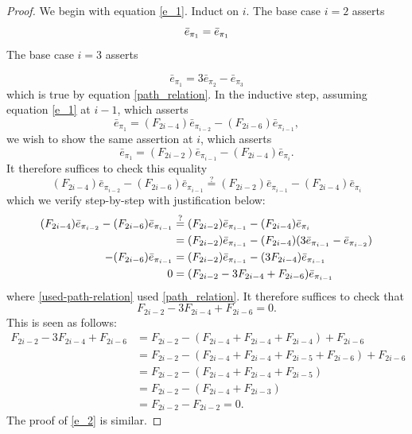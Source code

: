 \documentclass[10pt,reqno]{amsart}
\begin{document}
    

\begin{proof} We begin with equation \eqref{e_1}.
Induct on $i$.  The base case $i=2$ asserts 
\begin{equation*}
\bar{e}_{\pi_1} =  \bar{e}_{\pi_1}\\
\end{equation*}
The base case $i=3$ asserts 

\begin{equation*}
\bar{e}_{\pi_1}=  3\bar{e}_{\pi_2} - \bar{e}_{\pi_3}
\end{equation*} which is true by equation \eqref{path_relation}.
In the inductive step, assuming equation \eqref{e_1} at  $i-1$,
which asserts 
$$
\bar{e}_{\pi_1}=(F_{2i-4} )\bar{e}_{\pi_{i-2}}-(F_{2i-6}) \bar{e}_{\pi_{i-1}},
$$
we wish to show the same assertion at $i$, which asserts
$$
\bar{e}_{\pi_1}=(F_{2i-2} )\bar{e}_{\pi_{i-1}}-(F_{2i-4})\bar{e}_{\pi_{i}}. 
$$
It therefore suffices to check this equality
$$ (F_{2i-4} )\bar{e}_{\pi_{i-2}}-(F_{2i-6}) \bar{e}_{\pi_{i-1}} \overset{?}{=}
(F_{2i-2} )\bar{e}_{\pi_{i-1}}-(F_{2i-4})\bar{e}_{\pi_{i}}
$$ 
which we verify step-by-step with justification below:
\begin{align}
\notag (F_{2i-4} )\bar{e}_{\pi_{i-2}}-(F_{2i-6}) \bar{e}_{\pi_{i-1}}  &\overset{?}{=}(F_{2i-2} )\bar{e}_{\pi_{i-1}}-(F_{2i-4})\bar{e}_{\pi_{i}} \\
\label{used-path-relation}&= (F_{2i-2} )\bar{e}_{\pi_{i-1}}-(F_{2i-4})(3\bar{e}_{\pi_{i-1}}-\bar{e}_{\pi_{i-2}}) \\
\notag-(F_{2i-6}) \bar{e}_{\pi_{i-1}} &=(F_{2i-2} )\bar{e}_{\pi_{i-1}}-(3F_{2i-4})\bar{e}_{\pi_{i-1}}\\
\notag 0&=
(F_{2i-2}-3F_{2i-4}+F_{2i-6})\bar{e}_{\pi_{i-1}}
\end{align}
where \eqref{used-path-relation} used \eqref{path_relation}. It therefore suffices to check that
$$F_{2i-2}-3F_{2i-4}+F_{2i-6}=0.$$
This is seen as follows:
\begin{align*}
F_{2i-2}-3F_{2i-4}+F_{2i-6}
&=F_{2i-2}-(F_{2i-4}+F_{2i-4}+F_{2i-4})+F_{2i-6}\\
&=F_{2i-2}-(F_{2i-4}+F_{2i-4}+F_{2i-5}+F_{2i-6})+F_{2i-6}\\
&=F_{2i-2}-(F_{2i-4}+F_{2i-4}+F_{2i-5})\\
&=F_{2i-2}-(F_{2i-4}+F_{2i-3})\\
&=F_{2i-2}-F_{2i-2}=0.
\end{align*}
The proof of \eqref{e_2} is similar.
\end{proof}
\end{document}

